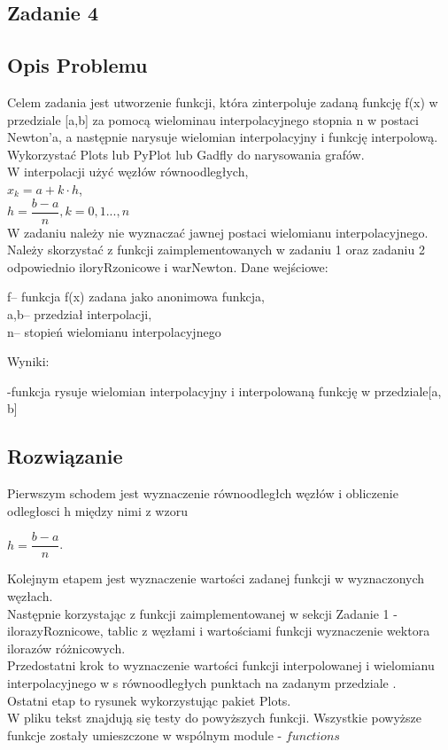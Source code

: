\documentclass[11pt]{article}
\begin{document}
\begin{flushleft}
\section{Zadanie 4}
\subsection{Opis Problemu}
Celem zadania jest utworzenie funkcji, która zinterpoluje zadaną funkcję f(x) w przedziale [a,b] za pomocą wielominau interpolacyjnego stopnia n w postaci Newton'a, a następnie narysuje wielomian interpolacyjny i funkcję interpolową. Wykorzystać Plots lub PyPlot lub Gadfly do narysowania grafów.\\
\quad W interpolacji użyć węzłów równoodległych, \\
\bigskip
\quad\quad$x_k=a+k\cdot h$,\\
\quad\quad $h =\dfrac{b-a}{n}, k = 0,1...,n$\\
W zadaniu należy nie wyznaczać jawnej postaci wielomianu interpolacyjnego. Należy skorzystać z funkcji zaimplementowanych w zadaniu 1 oraz zadaniu 2 odpowiednio iloryRzonicowe i warNewton. Dane wejściowe:\\
\begin{center}
f– funkcja f(x) zadana jako anonimowa funkcja,\\
a,b– przedział interpolacji, 
\\n– stopień wielomianu interpolacyjnego
\begin{flushleft}
Wyniki:
\end{flushleft}
-funkcja rysuje wielomian interpolacyjny i interpolowaną funkcję w przedziale[a, b]
\end{center}
\bigskip
\subsection{Rozwiązanie}
\bigskip
Pierwszym schodem jest wyznaczenie równoodległch węzłów i obliczenie odległosci h między nimi z wzoru
\bigskip
\begin{center}
$h=\dfrac{b-a}{n}$.\\
\end{center} 
\bigskip
 Kolejnym etapem jest wyznaczenie wartości zadanej funkcji w wyznaczonych węzłach.\\ Następnie korzystając z funkcji zaimplementowanej w sekcji Zadanie 1 - ilorazyRoznicowe, tablic z węzłami i wartościami funkcji wyznaczenie wektora ilorazów różnicowych.\\ Przedostatni krok to wyznaczenie wartości funkcji interpolowanej i wielomianu interpolacyjnego w s równoodległych punktach na zadanym przedziale .\\ Ostatni etap to rysunek wykorzystując pakiet Plots.\\
\bigskip
 W pliku tekst znajdują się testy do powyższych funkcji. Wszystkie powyższe funkcje zostały umieszczone w wspólnym module - $functions$
 

\end{flushleft}
\end{document}
